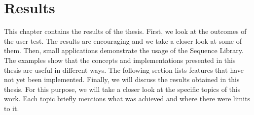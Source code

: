 \chapter{Results}
This chapter contains the results of the thesis. First, we look at the outcomes of the user test.
The results are encouraging and we take a closer look at some of them.
Then, small applications demonstrate the usage of the Sequence Library. The
examples show that the concepts and implementations presented in this thesis
are useful in different ways. The following section lists features that have not yet been
implemented. Finally, we will discuss the results obtained in this thesis. For
this purpose, we will take a closer look at the specific topics of this work.
Each topic briefly mentions what was achieved and where there were limits to
it.




